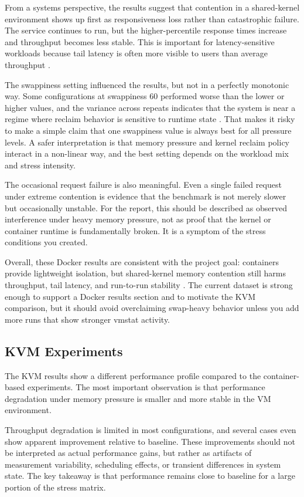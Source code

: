 \documentclass[conference]{IEEEtran}
\begin{document}
From a systems perspective, the results suggest that contention in a shared-kernel environment shows up first as responsiveness loss \cite{dean2013tail} rather than catastrophic failure. The service continues to run, but the higher-percentile response times increase and throughput becomes less stable. This is important for latency-sensitive workloads because tail latency is often more visible to users than average throughput \cite{dean2013tail}.

The swappiness setting influenced the results, but not in a perfectly monotonic way. Some configurations at swappiness 60 performed worse than the lower or higher values, and the variance across repeats indicates that the system is near a regime where reclaim behavior is sensitive to runtime state \cite{mars2011bubble}. That makes it risky to make a simple claim that one swappiness value is always best for all pressure levels. A safer interpretation is that memory pressure and kernel reclaim policy interact in a non-linear way, and the best setting depends on the workload mix and stress intensity.

The occasional request failure is also meaningful. Even a single failed request under extreme contention is evidence that the benchmark is not merely slower but occasionally unstable. For the report, this should be described as observed interference under heavy memory pressure, not as proof that the kernel or container runtime is fundamentally broken. It is a symptom of the stress conditions you created.

Overall, these Docker results are consistent with the project goal: containers provide lightweight isolation, but shared-kernel memory contention still harms throughput, tail latency, and run-to-run stability \cite{bhaia2024isolation}. The current dataset is strong enough to support a Docker results section and to motivate the KVM comparison, but it should avoid overclaiming swap-heavy behavior unless you add more runs that show stronger vmstat activity.

\subsection{KVM Experiments}

The KVM results show a different performance profile compared to the container-based experiments. The most important observation is that performance degradation under memory pressure is smaller and more stable in the VM environment.

Throughput degradation is limited in most configurations, and several cases even show apparent improvement relative to baseline. These improvements should not be interpreted as actual performance gains, but rather as artifacts of measurement variability, scheduling effects, or transient differences in system state. The key takeaway is that performance remains close to baseline for a large portion of the stress matrix.
\end{document}
